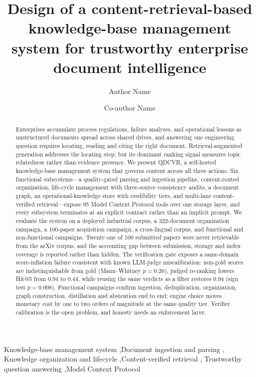 \documentclass[preprint,12pt]{elsarticle}
\begin{document}
\begin{frontmatter}

\title{Design of a content-retrieval-based knowledge-base management system
for trustworthy enterprise document intelligence}

\author[inst1]{Author Name}
\author[inst1]{Co-author Name}

\begin{abstract}
Enterprises accumulate process regulations, failure analyses, and operational
lessons as unstructured documents spread across shared drives, and answering
one engineering question requires locating, reading and citing the right
document. Retrieval-augmented generation addresses the locating step, but its
dominant ranking signal measures topic relatedness rather than evidence
presence. We present QDCVR, a self-hosted knowledge-base management system that
governs content across all three actions. Six functional subsystems---a
quality-gated parsing and ingestion pipeline, content-routed organization,
life-cycle management with three-source consistency audits, a document graph,
an operational-knowledge store with credibility tiers, and multi-lane
content-verified retrieval---expose 95 Model Context Protocol tools over one
storage layer, and every subsystem terminates at an explicit contract rather
than an implicit prompt. We evaluate the system on a deployed industrial
corpus, a 322-document organization campaign, a 100-paper acquisition
campaign, a cross-lingual corpus, and functional and non-functional campaigns.
Twenty-one of 100 submitted papers were never retrievable from the arXiv
corpus, and the accounting gap between submission, storage and index coverage
is reported rather than hidden. The verification gate exposes a same-domain
score-inflation failure consistent with known LLM-judge miscalibration:
non-gold scores are indistinguishable from gold (Mann--Whitney $p = 0.26$),
judged re-ranking lowers Hit@5 from 0.94 to 0.44, while reusing the same
verdicts as a filter restores 0.94 (sign test $p = 0.008$). Functional
campaigns confirm ingestion, deduplication, organization, graph construction,
distillation and abstention end to end; engine choice moves monetary cost by
one to two orders of magnitude at the same quality tier. Verifier calibration
is the open problem, and honesty needs an enforcement layer.
\end{abstract}

\begin{keyword}
Knowledge-base management system \sep Document ingestion and parsing \sep
Knowledge organization and lifecycle \sep Content-verified retrieval \sep
Trustworthy question answering \sep Model Context Protocol
\end{keyword}

\end{frontmatter}
\end{document}
